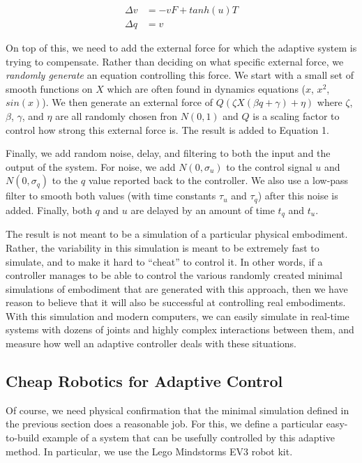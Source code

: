 \documentclass{frontiersSCNS} %
\begin{document}
\begin{align}
    \Delta v & =  -v F + tanh(u)T \\
    \Delta q & = v
\end{align}

On top of this, we need to add the external force for which the adaptive system
is trying to compensate.  Rather than deciding on what specific external
force, we \emph{randomly generate} an equation controlling this force.  We start with a small set of
smooth functions on $X$ which are often found in dynamics equations ($x$, $x^2$,
$sin(x)$).  We then generate an external force of $Q (\zeta X(\beta q + \gamma) + \eta)$
where $\zeta$, $\beta$, $\gamma$, and $\eta$ are all randomly chosen fron $N(0,1)$
and $Q$ is a scaling factor to control how strong this external force is.  The
result is added to Equation 1.

Finally, we add random noise, delay, and filtering to both the input and the
output of the system.  For noise, we add $N(0,\sigma_u)$ to the control signal
$u$ and $N(0,\sigma_q)$ to the $q$ value reported back to the controller.  We
also use a low-pass filter to smooth both values (with time constants $\tau_u$
and $\tau_q$) after this noise is added.  Finally, both $q$ and $u$ are delayed
by an amount of time $t_q$ and $t_u$.

The result is not meant to be a simulation of a particular physical embodiment.
Rather, the variability in this simulation is meant to be extremely fast
to simulate, and to make it hard to ``cheat''
to control it.  In other words, if a controller manages to be able to control
the various randomly created minimal simulations of embodiment that are
generated with this approach, then we have reason to believe that it will also
be successful at controlling real embodiments.  With this simulation and
modern computers, we can easily simulate in real-time systems with dozens of joints and
highly complex interactions between them, and measure how well an adaptive
controller deals with these situations.

\subsection{Cheap Robotics for Adaptive Control}

Of course, we need physical confirmation that the minimal simulation defined
in the previous section does a reasonable job.  For this, we define a
particular easy-to-build example of a system that can be usefully controlled
by this adaptive method.  In particular, we use the Lego Mindstorms EV3 robot kit.
\end{document}
